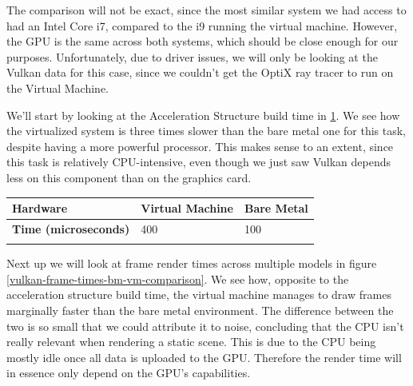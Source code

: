 The comparison will not be exact, since the most similar system we had access to had an Intel Core i7, compared to the i9 running the virtual machine. However, the GPU is the same across both systems, which should be close enough for our purposes. Unfortunately, due to driver issues, we will only be looking at the Vulkan data for this case, since we couldn't get the OptiX ray tracer to run on the Virtual Machine.

We'll start by looking at the Acceleration Structure build time in \ref{vulkan-accelbuildtime-bm-vm-comparison}. We see how the virtualized system is three times slower than the bare metal one for this task, despite having a more powerful processor. This makes sense to an extent, since this task is relatively CPU-intensive, even though we just saw Vulkan depends less on this component than on the graphics card.

\begin{center}
  \begin{table}
    \begin{tabular}{ | m{5cm}| m{3cm} | m{3cm} |}
  \hline
  \textbf{Hardware}& Virtual Machine& Bare Metal\\
  \hline
  \textbf{Time (microseconds)}& 400& 100 \\
  \hline
  \label{vulkan-accelbuildtime-bm-vm-comparison}
\end{tabular}
\end{table}
\end{center}

Next up we will look at frame render times across multiple models in figure \ref{vulkan-frame-times-bm-vm-comparison}. We see how, opposite to the acceleration structure build time, the virtual machine manages to draw frames marginally faster than the bare metal environment. The difference between the two is so small that we could attribute it to noise, concluding that the CPU isn't really relevant when rendering a static scene. This is due to the CPU being mostly idle once all data is uploaded to the GPU. Therefore the render time will in essence only depend on the GPU's capabilities.

